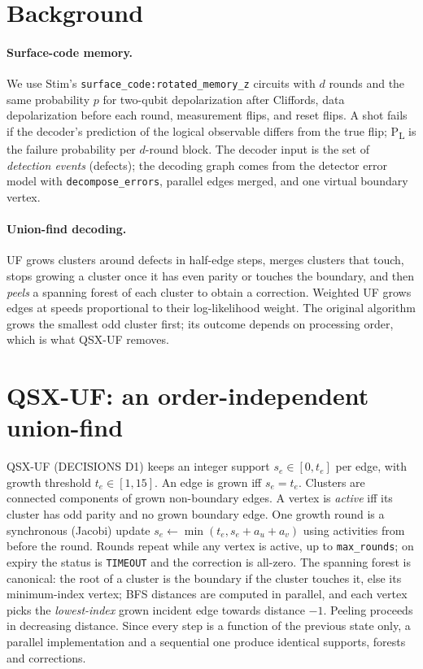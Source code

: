 \documentclass[10pt]{article}
\begin{document}
\section{Background}
\paragraph{Surface-code memory.} We use Stim's \texttt{surface\_code:rotated\_memory\_z} circuits
\cite{gidney2021stim} with $d$ rounds and the same probability $p$ for two-qubit depolarization after
Cliffords, data depolarization before each round, measurement flips, and reset flips. A shot fails if the
decoder's prediction of the logical observable differs from the true flip; P\textsubscript{L} is the failure
probability per $d$-round block. The decoder input is the set of \emph{detection events} (defects); the
decoding graph comes from the detector error model with \texttt{decompose\_errors}, parallel edges merged,
and one virtual boundary vertex.

\paragraph{Union-find decoding.} UF \cite{delfosse2021uf} grows clusters around defects in half-edge steps,
merges clusters that touch, stops growing a cluster once it has even parity or touches the boundary, and then
\emph{peels} a spanning forest of each cluster to obtain a correction. Weighted UF \cite{huang2020weighted}
grows edges at speeds proportional to their log-likelihood weight. The original algorithm grows the
smallest odd cluster first; its outcome depends on processing order, which is what QSX-UF removes.

\section{QSX-UF: an order-independent union-find}\label{sec:alg}
QSX-UF (DECISIONS D1) keeps an integer support $s_e\in[0,t_e]$ per edge, with growth threshold
$t_e\in[1,15]$. An edge is grown iff $s_e=t_e$. Clusters are connected components of grown non-boundary
edges. A vertex is \emph{active} iff its cluster has odd parity and no grown boundary edge. One growth round
is a synchronous (Jacobi) update $s_e\leftarrow\min(t_e, s_e+a_u+a_v)$ using activities from before the
round. Rounds repeat while any vertex is active, up to \texttt{max\_rounds}; on expiry the status is
\texttt{TIMEOUT} and the correction is all-zero. The spanning forest is canonical: the root of a cluster is
the boundary if the cluster touches it, else its minimum-index vertex; BFS distances are computed in
parallel, and each vertex picks the \emph{lowest-index} grown incident edge towards distance $-1$. Peeling
proceeds in decreasing distance. Since every step is a function of the previous state only, a parallel
implementation and a sequential one produce identical supports, forests and corrections.
\end{document}
